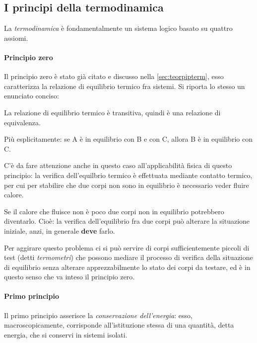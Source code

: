 \subsection{I principi della termodinamica}
La \textit{termodinamica} è fondamentalmente un sistema logico basato su quattro assiomi.

\paragraph{Principio zero} Il principio zero è stato già citato e discusso nella \cref{sec:teorpipterm}, esso caratterizza la relazione di equilibrio termico fra sistemi. Si riporta lo stesso un enunciato conciso:

\begin{defn}
	La relazione di equilibrio termico è transitiva, quindi è una relazione di equivalenza.
	
	Più esplicitamente: se A è in equilibrio con B e con C, allora B è in equilibrio con C.
\end{defn}

\begin{note}
	C'è da fare attenzione anche in questo caso all'applicabilità fisica di questo principio: la verifica dell'equilbrio termico è effettuata mediante contatto termico, per cui per stabilire che due corpi non sono in equilibrio è necessario veder fluire calore.
	
	Se il calore che fluisce non è poco due corpi non in equilibrio potrebbero diventarlo. Cioè: la verifica dell'equilibrio fra due corpi può alterare la situazione iniziale, anzi, in generale \textbf{deve} farlo.
	
	Per aggirare questo problema ci si può servire di corpi sufficientemente piccoli di test (detti \textit{termometri}) che possono mediare il processo di verifica della situazione di equilibrio senza alterare apprezzabilmente lo stato dei corpi da testare, ed è in questo senso che va inteso il principio zero.
\end{note}

\paragraph{Primo principio} Il primo principio asserisce la \textit{conservazione dell'energia}: esso, macroscopicamente, corrisponde all'istituzione stessa di una quantità, detta energia, che si conservi in sistemi isolati.

